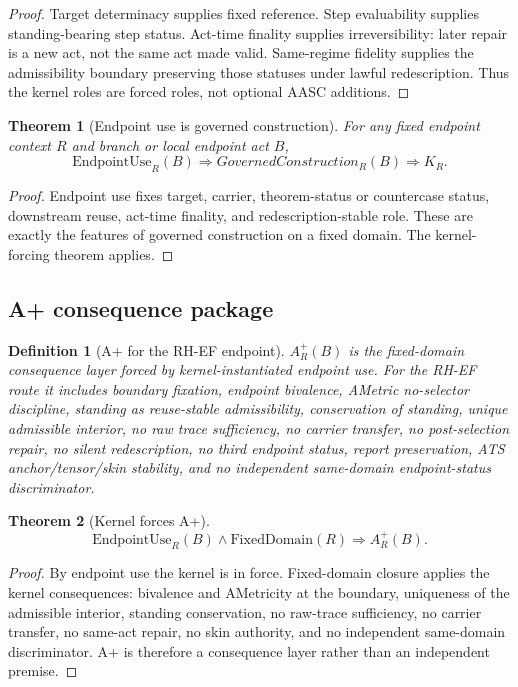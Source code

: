 \documentclass[11pt]{article}
\newtheorem{definition}{Definition}[section]
\newtheorem{theorem}{Theorem}[section]
\newcommand{\EndpointUse}{\mathrm{EndpointUse}}
\newcommand{\FixedDomain}{\mathrm{FixedDomain}}
\newcommand{\Aplus}{A^+}
\begin{document}
\begin{proof}
Target determinacy supplies fixed reference.  Step evaluability supplies standing-bearing step status.  Act-time finality supplies irreversibility: later repair is a new act, not the same act made valid.  Same-regime fidelity supplies the admissibility boundary preserving those statuses under lawful redescription.  Thus the kernel roles are forced roles, not optional AASC additions.
\end{proof}

\begin{theorem}[Endpoint use is governed construction]
For any fixed endpoint context \(R\) and branch or local endpoint act \(B\),
\[
\EndpointUse_R(B)\Rightarrow GovernedConstruction_R(B)\Rightarrow K_R.
\]
\end{theorem}

\begin{proof}
Endpoint use fixes target, carrier, theorem-status or countercase status, downstream reuse, act-time finality, and redescription-stable role.  These are exactly the features of governed construction on a fixed domain.  The kernel-forcing theorem applies.
\end{proof}

\subsection{A+ consequence package}

\begin{definition}[A+ for the RH-EF endpoint]
\(\Aplus_R(B)\) is the fixed-domain consequence layer forced by kernel-instantiated endpoint use.  For the RH-EF route it includes boundary fixation, endpoint bivalence, AMetric no-selector discipline, standing as reuse-stable admissibility, conservation of standing, unique admissible interior, no raw trace sufficiency, no carrier transfer, no post-selection repair, no silent redescription, no third endpoint status, report preservation, ATS anchor/tensor/skin stability, and no independent same-domain endpoint-status discriminator.
\end{definition}

\begin{theorem}[Kernel forces A+]
\[
\EndpointUse_R(B)\wedge \FixedDomain(R)\Rightarrow \Aplus_R(B).
\]
\end{theorem}

\begin{proof}
By endpoint use the kernel is in force.  Fixed-domain closure applies the kernel consequences: bivalence and AMetricity at the boundary, uniqueness of the admissible interior, standing conservation, no raw-trace sufficiency, no carrier transfer, no same-act repair, no skin authority, and no independent same-domain discriminator.  A+ is therefore a consequence layer rather than an independent premise.
\end{proof}
\end{document}
